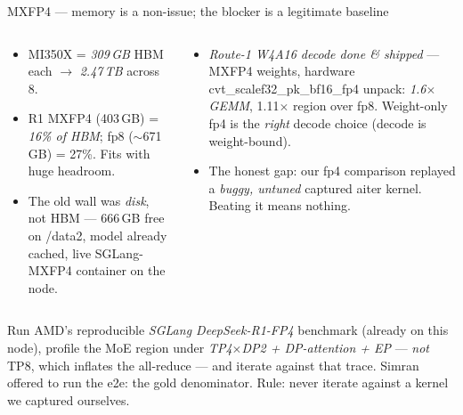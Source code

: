 \documentclass[pdf,aspectratio=169]{beamer}
\newcommand{\empy}[1]{{\color{darkorange}\emph{#1}}}
\newcommand{\empr}[1]{{\color{cardinalred}\emph{#1}}}
\newcommand{\examplebox}[2]{%
\begin{tcolorbox}[colframe=darkcardinal,colback=boxgray,title={#1}]
#2
\end{tcolorbox}}
\newcommand{\mc}[1]{{\ttfamily\small #1}}
\begin{document}
\begin{frame}{MXFP4 --- memory is a non-issue; the blocker is a legitimate baseline}
\footnotesize
\begin{columns}
\begin{column}{0.5\textwidth}
\examplebox{``Will R1 fit on 8 GPUs?'' --- checked}{\footnotesize
\begin{itemize}\scriptsize
  \item MI350X = \empy{309\,GB} HBM each $\to$ \empy{2.47\,TB} across 8.
  \item R1 MXFP4 (403\,GB) = \empr{16\% of HBM}; fp8 ($\sim$671\,GB) = 27\%. Fits with huge headroom.
  \item The old wall was \emph{disk}, not HBM --- 666\,GB free on \mc{/data2}, model already cached, live SGLang-MXFP4 container on the node.
\end{itemize}}
\end{column}
\begin{column}{0.5\textwidth}
\examplebox{status of the fp4 kernel work}{\footnotesize
\begin{itemize}\scriptsize
  \item \empr{Route-1 W4A16 decode done \& shipped} --- MXFP4 weights, hardware \mc{cvt\_scalef32\_pk\_bf16\_fp4} unpack: \empy{1.6$\times$ GEMM}, 1.11$\times$ region over fp8. Weight-only fp4 is the \emph{right} decode choice (decode is weight-bound).
  \item The honest gap: our fp4 comparison replayed a \empr{buggy, untuned} captured aiter kernel. Beating it means nothing.
\end{itemize}}
\end{column}
\end{columns}
\examplebox{The plan --- measure against the real stack, in the realistic config}{\footnotesize
Run AMD's reproducible \empy{SGLang DeepSeek-R1-FP4} benchmark (already on this node), profile the MoE region under \empr{TP4$\times$DP2 + DP-attention + EP} --- \emph{not} TP8, which inflates the all-reduce --- and iterate against that trace. Simran offered to run the e2e: the gold denominator. Rule: never iterate against a kernel we captured ourselves.}
\end{frame}
\end{document}
